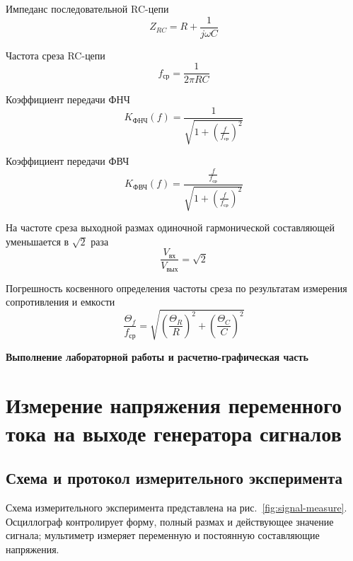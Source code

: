 \documentclass[12pt,a4paper]{article}
\begin{document}
Импеданс последовательной RC-цепи
\begin{equation*}
Z_{RC}=R+\frac{1}{j\omega C}
\end{equation*}

Частота среза RC-цепи
\begin{equation}
f_{\text{ср}}=\frac{1}{2\pi RC}
\label{eq:fcut}
\end{equation}

Коэффициент передачи ФНЧ
\begin{equation*}
K_{\text{ФНЧ}}(f)=\frac{1}{\sqrt{1+\left(\frac{f}{f_{\text{ср}}}\right)^2}}
\end{equation*}

Коэффициент передачи ФВЧ
\begin{equation*}
K_{\text{ФВЧ}}(f)=\frac{\frac{f}{f_{\text{ср}}}}{\sqrt{1+\left(\frac{f}{f_{\text{ср}}}\right)^2}}
\end{equation*}

На частоте среза выходной размах одиночной гармонической составляющей уменьшается в $\sqrt2$ раза
\begin{equation}
\frac{V_{\text{вх}}}{V_{\text{вых}}}=\sqrt2
\label{eq:sqrt2}
\end{equation}

Погрешность косвенного определения частоты среза по результатам измерения сопротивления и емкости
\begin{equation}
\frac{\Theta_f}{f_{\text{ср}}}=\sqrt{\left(\frac{\Theta_R}{R}\right)^2+\left(\frac{\Theta_C}{C}\right)^2}
\label{eq:fcut-error}
\end{equation}

\pagebreak

\begin{center}
\LARGE{\textbf{Выполнение лабораторной работы и расчетно-графическая часть}}
\end{center}

\section{Измерение напряжения переменного тока на выходе генератора сигналов}

\subsection{Схема и протокол измерительного эксперимента}

Схема измерительного эксперимента представлена на рис.~\ref{fig:signal-measure}. Осциллограф контролирует форму, полный размах и действующее значение сигнала; мультиметр измеряет переменную и постоянную составляющие напряжения.
\end{document}
